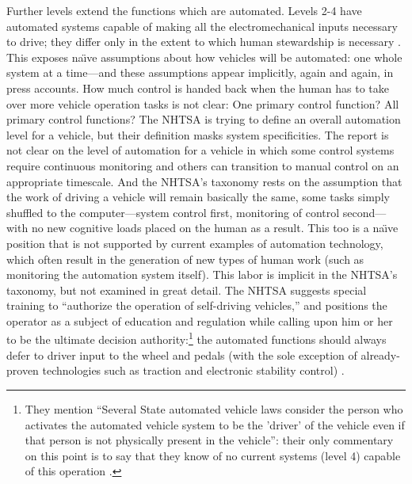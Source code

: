 Further levels extend the functions which are automated. Levels 2-4
have automated systems capable of making all the electromechanical
inputs necessary to drive; they differ only in the extent to which
human stewardship is necessary \cite[p. 4--5]{NHTSA}. This exposes na\"{\i}ve assumptions about
how vehicles will be automated:  one whole system at a time---and
these assumptions appear implicitly, again and again, in press
accounts. How much
control is handed back when the human has to take over more vehicle
operation tasks is not clear: One primary control function? All
primary control functions? The NHTSA is trying to define an overall
automation level for a vehicle, but their definition masks system
specificities. The report is not clear on the level of automation for
a vehicle in which some control systems require continuous monitoring
and others can transition to manual control on an appropriate
timescale. And the NHTSA's taxonomy rests on the assumption that the
work of driving a vehicle will remain basically the same, some tasks
simply shuffled to the computer---system control first, monitoring of
control second---with no new cognitive loads placed on the human as a
result. This too is a na\"{\i}ve position that is not supported by current
examples of automation technology, which often result in the
generation of new types of human work (such as monitoring the
automation system itself). This labor is implicit in the NHTSA's
taxonomy, but not examined in great detail. The NHTSA suggests special
training to ``authorize the operation of self-driving
vehicles,'' \cite[p. 11]{NHTSA} and
positions the operator as a subject of education and regulation while
calling upon him or her to be the ultimate decision
authority:\footnote{They mention ``Several State automated vehicle laws
consider the person who activates the automated vehicle system to be
the 'driver' of the vehicle even if that person is not physically
present in the vehicle'': their only commentary on this point is to say
that they know of no current systems (level 4) capable of this
operation \cite[p. 5]{NHTSA}.} the
automated functions should always defer to driver input to the wheel
and pedals (with the sole exception of already-proven technologies
such as traction and electronic stability control) \cite[p. 13]{NHTSA}.

